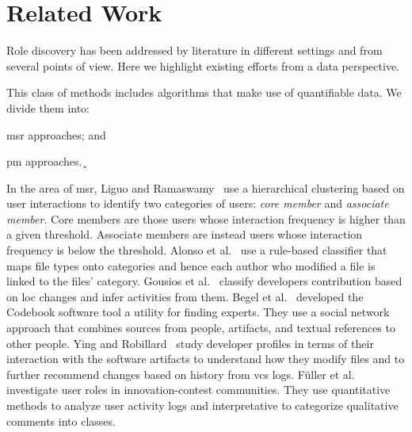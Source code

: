 \section{Related Work}
Role discovery has been addressed by literature in different settings and from several points of view. Here we highlight existing efforts from a data perspective.


This class of methods includes algorithms that make use of quantifiable data. We divide them into: 
\begin{inparaenum}[\itshape a)]
   \item \gls*{msr} approaches; and
   \item \gls*{pm} approaches.¸
\end{inparaenum}

In the area of \gls*{msr}, Liguo and Ramaswamy~\cite{Yu.LiguoRamaswamy.2007} use a hierarchical clustering based on user interactions to identify two categories of users: \emph{core member} and \emph{associate member}. Core members are those users whose interaction frequency is higher than a given threshold. Associate members are instead users whose interaction frequency is below the threshold.
Alonso et al.~\cite{Alonso2008} use a rule-based classifier that maps file types onto categories and hence each author who modified a file is linked to the files' category. Gousios et al.~\cite{gousios2008measuring} classify developers contribution based on \gls*{loc} changes and infer activities from them. Begel et al.~\cite{Begel2010} developed the Codebook software tool a utility for finding experts. They use a social network approach that combines sources from people, artifacts, and textual references to other people. 
Ying and Robillard~\cite{Ying2014} study developer profiles in terms of their interaction with the software artifacts to understand how they modify files and to further recommend changes based on history from \gls*{vcs} logs. Füller et al.~\cite{Fuller2014a} investigate user roles in innovation-contest communities. They use quantitative methods to analyze user activity logs and interpretative to categorize qualitative comments into classes. 

